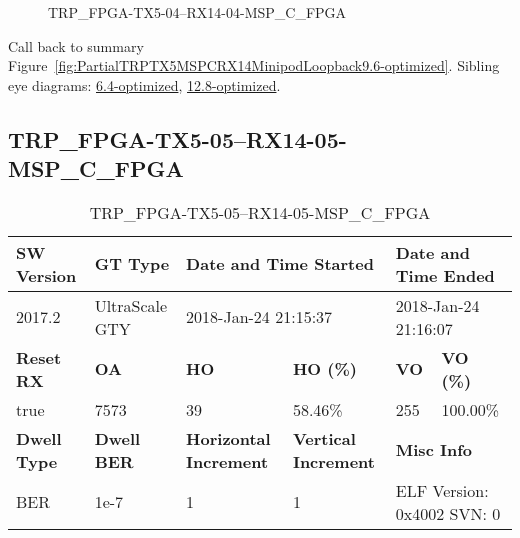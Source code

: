 \begin{figure}[h]
\caption{TRP\_FPGA-TX5-04--RX14-04-MSP\_C\_FPGA} \label{fig:TRPFPGATX504RX1404MSPCFPGA9.6-optimized}
\end{figure}

Call back to summary Figure~\ref{fig:PartialTRPTX5MSPCRX14MinipodLoopback9.6-optimized}.
Sibling eye diagrams: \hyperref[sec:TRPFPGATX504RX1404MSPCFPGA6.4-optimized]{6.4-optimized}, \hyperref[sec:TRPFPGATX504RX1404MSPCFPGA12.8-optimized]{12.8-optimized}.

\clearpage
\newpage


\subsection{TRP\_FPGA-TX5-05--RX14-05-MSP\_C\_FPGA}\label{sec:TRPFPGATX505RX1405MSPCFPGA9.6-optimized}

\begin{table}[h]
\centering
\caption{TRP\_FPGA-TX5-05--RX14-05-MSP\_C\_FPGA}
\label{tab:TRPFPGATX505RX1405MSPCFPGA9.6-optimized}
\begin{tabular}{@{}|l|l|l|l|l|l|@{}}
\toprule
\textbf{SW Version}                & \textbf{GT Type}   & \multicolumn{2}{l|}{\textbf{Date and Time Started}}            & \multicolumn{2}{l|}{\textbf{Date and Time Ended}}        \\ \midrule
2017.2                       & UltraScale GTY          & \multicolumn{2}{l|}{2018-Jan-24 21:15:37}                   & \multicolumn{2}{l|}{2018-Jan-24 21:16:07}               \\ \midrule
\textbf{Reset RX}                  & \textbf{OA} & \textbf{HO}   & \textbf{HO (\%)} & \textbf{VO} & \textbf{VO (\%)} \\ \midrule
true & 7573        & 39          & 58.46\%        & 255        & 100.00\%       \\ \midrule
\textbf{Dwell Type}                & \textbf{Dwell BER} & \textbf{Horizontal Increment} & \textbf{Vertical Increment}    & \multicolumn{2}{l|}{\textbf{Misc Info}}                  \\ \midrule
BER                            & 1e-7        & 1        & 1           & \multicolumn{2}{l|}{ELF Version: 0x4002 SVN: 0}                         \\ \bottomrule
\end{tabular}
\end{table}

